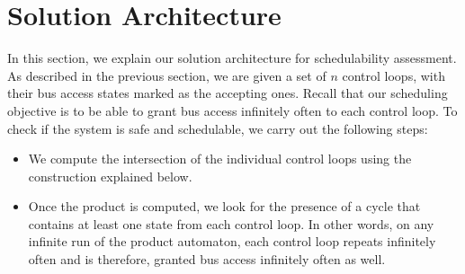 \section{Solution Architecture} \label{sec4}
\noindent
In this section, we explain our solution architecture for schedulability assessment. As described in the previous section, we are given a set of $n$ control loops, with their bus access states marked as the accepting ones. Recall that our scheduling objective is to be able to grant bus access infinitely often to each control loop. To check if the system is safe and schedulable, we carry out the following steps: 

\begin{itemize}

\item We compute the intersection of the individual control loops using the construction explained below. 

\item Once the product is computed, we look for the presence of a cycle that contains at least one state from each control loop. In other words, on any infinite run of the product automaton, each control loop repeats infinitely often and is therefore, granted bus access infinitely often as well. \\

\end{itemize}

